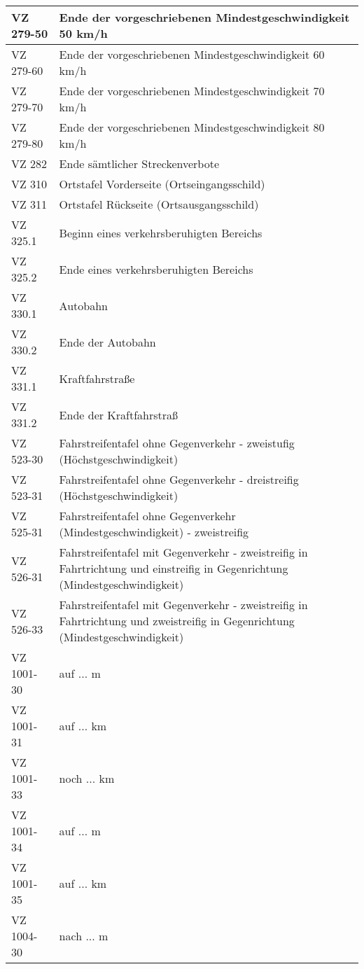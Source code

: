 \begin{appendix}
\begin{longtabu}{l X[j]}
\gls{VZ}	279-50	& Ende der vorgeschriebenen Mindestgeschwindigkeit 50 km/h\\ \hline
\gls{VZ}	279-60	& Ende der vorgeschriebenen Mindestgeschwindigkeit 60 km/h\\ \hline
\gls{VZ}	279-70	& Ende der vorgeschriebenen Mindestgeschwindigkeit 70 km/h\\ \hline
\gls{VZ}	279-80	& Ende der vorgeschriebenen Mindestgeschwindigkeit 80 km/h\\ \hline
\gls{VZ}	282	    & Ende sämtlicher Streckenverbote\\ \hline
\gls{VZ}	310	    & Ortstafel Vorderseite (\glqq{}Ortseingangsschild\grqq)\\ \hline
\gls{VZ}	311	    & Ortstafel Rückseite (\glqq{}Ortsausgangsschild\grqq)\\ \hline
\gls{VZ}	325.1	& Beginn eines verkehrsberuhigten Bereichs\\ \hline
\gls{VZ}	325.2	& Ende eines verkehrsberuhigten Bereichs\\ \hline
\gls{VZ}	330.1	& Autobahn\\ \hline
\gls{VZ}	330.2	& Ende der Autobahn\\ \hline
\gls{VZ}	331.1	& Kraftfahrstraße\\ \hline
\gls{VZ}	331.2	& Ende der Kraftfahrstraß\\ \hline
\gls{VZ}	523-30	& Fahrstreifentafel ohne Gegenverkehr - zweistufig (Höchstgeschwindigkeit)\\ \hline
\gls{VZ}	523-31	& Fahrstreifentafel ohne Gegenverkehr - dreistreifig (Höchstgeschwindigkeit)\\ \hline
\gls{VZ}	525-31	& Fahrstreifentafel ohne Gegenverkehr (Mindestgeschwindigkeit) - zweistreifig\\ \hline
\gls{VZ}	 526-31	& Fahrstreifentafel mit Gegenverkehr - zweistreifig in Fahrtrichtung und einstreifig in Gegenrichtung (Mindestgeschwindigkeit)\\ \hline
\gls{VZ}	 526-33	& Fahrstreifentafel mit Gegenverkehr - zweistreifig in Fahrtrichtung und zweistreifig in Gegenrichtung (Mindestgeschwindigkeit)\\ \hline
\gls{VZ}	1001-30	& auf ... m \\ \hline
\gls{VZ}	1001-31	& auf ... km \\ \hline
\gls{VZ}	1001-33	& noch ... km \\ \hline
\gls{VZ}	1001-34	& auf ... m \\ \hline
\gls{VZ}	1001-35	& auf ... km \\ \hline
\gls{VZ}	1004-30	& nach ... m \\ \hline

\end{longtabu}
\end{appendix}
